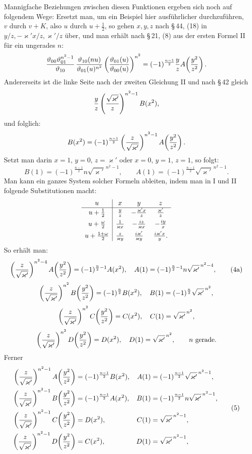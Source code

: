 \documentclass[11pt]{article}
\begin{document}
Mannigfache Beziehungen zwischen diesen Funktionen ergeben sich noch auf folgendem Wege:
Ersetzt man, um ein Beispiel hier ausführlicher durchzuführen, $v$ durch $v+K$, also
$u$ durch $u+\frac12$, so gehen $x,y,z$ nach \S\,44, (18) in
$y/z,-\varkappa' x/z,\varkappa'/z$ über, und man erhält nach \S\,21, (8) aus der
ersten Formel II für ein ungerades $n$:
\[
{\vartheta_{00}\vartheta_{01}^{n^2-1}\over\vartheta_{10}}\,
{\vartheta_{10}(nu)\over\vartheta_{01}(u)^{n^2}}
\left({\vartheta_{01}(u)\over\vartheta_{00}(u)}\right)^{n^2}
=(-1)^{\frac{n-1}{2}}{y\over z} A\!\left({y^2\over z^2}\right).
\]
Andererseits ist die linke Seite nach der zweiten Gleichung II und nach \S\,42 gleich
\[
{y\over z}\left({\sqrt{\varkappa'}\over z}\right)^{n^2-1}B(x^2),
\]
und folglich:
\[
B(x^2)=(-1)^{\frac{n-1}{2}}\left({z\over\sqrt{\varkappa'}}\right)^{n^2-1}
A\!\left({y^2\over z^2}\right).
\]
Setzt man darin $x=1$, $y=0$, $z=\varkappa'$ oder $x=0$, $y=1$, $z=1$, so folgt:
\[
B(1)=(-1)^{\frac{n-1}{2}}n\sqrt{\varkappa'}^{\,n^2-1},
\qquad
A(1)=(-1)^{\frac{n-1}{2}}\sqrt{\varkappa'}^{\,n^2-1}.
\]
Man kann ein ganzes System solcher Formeln ableiten, indem man in I und II folgende
Substitutionen macht:
\[
\begin{array}{c|ccc}
u&x&y&z\\ \hline
u+\frac12&{y\over z}&-{\varkappa' x\over z}&{\varkappa'\over z}\\[0.4em]
u+\frac{\omega}{2}&{1\over\varkappa x}&-{i z\over\varkappa x}&-{i y\over x}\\[0.4em]
u+\frac{1+\omega}{2}&{z\over\varkappa y}&{i\varkappa'\over\varkappa y}&{i\varkappa' x\over y}.
\end{array}
\]
So erhält man:
\begin{equation}
\left({z\over\sqrt{\varkappa'}}\right)^{n^2-4}A\!\left({y^2\over z^2}\right)
=(-1)^{\frac n2-1}A(x^2),\quad
A(1)=(-1)^{\frac n2-1}n\sqrt{\varkappa'}^{\,n^2-4},
\tag{4a}
\end{equation}
\[
\left({z\over\sqrt{\varkappa'}}\right)^{n^2}B\!\left({y^2\over z^2}\right)
=(-1)^{\frac n2}B(x^2),\quad
B(1)=(-1)^{\frac n2}\sqrt{\varkappa'}^{\,n^2},
\]
\[
\left({z\over\sqrt{\varkappa'}}\right)^{n^2}C\!\left({y^2\over z^2}\right)
=C(x^2),\quad C(1)=\sqrt{\varkappa'}^{\,n^2},
\]
\[
\left({z\over\sqrt{\varkappa'}}\right)^{n^2}D\!\left({y^2\over z^2}\right)
=D(x^2),\quad D(1)=\sqrt{\varkappa'}^{\,n^2},
\qquad n\ \text{gerade}.
\]
Ferner
\begin{equation}
\begin{aligned}
\left({z\over\sqrt{\varkappa'}}\right)^{n^2-1}A\!\left({y^2\over z^2}\right)
&=(-1)^{\frac{n-1}{2}}B(x^2),
& A(1)&=(-1)^{\frac{n-1}{2}}\sqrt{\varkappa'}^{\,n^2-1},\\
\left({z\over\sqrt{\varkappa'}}\right)^{n^2-1}B\!\left({y^2\over z^2}\right)
&=(-1)^{\frac{n-1}{2}}A(x^2),
& B(1)&=(-1)^{\frac{n-1}{2}}n\sqrt{\varkappa'}^{\,n^2-1},\\
\left({z\over\sqrt{\varkappa'}}\right)^{n^2-1}C\!\left({y^2\over z^2}\right)
&=D(x^2),
& C(1)&=\sqrt{\varkappa'}^{\,n^2-1},\\
\left({z\over\sqrt{\varkappa'}}\right)^{n^2-1}D\!\left({y^2\over z^2}\right)
&=C(x^2),
& D(1)&=\sqrt{\varkappa'}^{\,n^2-1},
\end{aligned}
\tag{5}
\end{equation}
\end{document}
